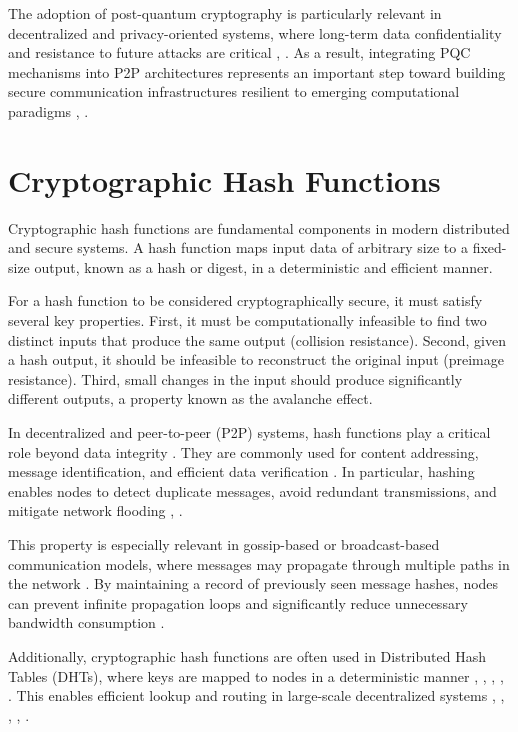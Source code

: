 \documentclass[
  12pt,
  oneside,
  a4paper,
  chapter=TITLE,
  section=TITLE,
  english,
  brazil
]{abntex2}
\begin{document}
The adoption of post-quantum cryptography is particularly relevant in decentralized and privacy-oriented systems, where long-term data confidentiality and resistance to future attacks are critical \cite{bos2017kyber}, \cite{nist2024fips203}. As a result, integrating PQC mechanisms into P2P architectures represents an important step toward building secure communication infrastructures resilient to emerging computational paradigms \cite{bos2017kyber}, \cite{nist2024fips203}.


\section{Cryptographic Hash Functions}

Cryptographic hash functions are fundamental components in modern distributed and secure systems. A hash function maps input data of arbitrary size to a fixed-size output, known as a hash or digest, in a deterministic and efficient manner.

For a hash function to be considered cryptographically secure, it must satisfy several key properties. First, it must be computationally infeasible to find two distinct inputs that produce the same output (collision resistance). Second, given a hash output, it should be infeasible to reconstruct the original input (preimage resistance). Third, small changes in the input should produce significantly different outputs, a property known as the avalanche effect.

In decentralized and peer-to-peer (P2P) systems, hash functions play a critical role beyond data integrity \cite{augustine2022byzantine}. They are commonly used for content addressing, message identification, and efficient data verification \cite{augustine2022byzantine}. In particular, hashing enables nodes to detect duplicate messages, avoid redundant transmissions, and mitigate network flooding \cite{mehr2019unstructured}, \cite{augustine2022byzantine}.

This property is especially relevant in gossip-based or broadcast-based communication models, where messages may propagate through multiple paths in the network \cite{augustine2022byzantine}. By maintaining a record of previously seen message hashes, nodes can prevent infinite propagation loops and significantly reduce unnecessary bandwidth consumption \cite{augustine2022byzantine}.

Additionally, cryptographic hash functions are often used in Distributed Hash Tables (DHTs), where keys are mapped to nodes in a deterministic manner \cite{stoica2001chord}, \cite{maymounkov2002kademlia}, \cite{rowstron2001pastry}, \cite{zhao2001tapestry}, \cite{augustine2022byzantine}. This enables efficient lookup and routing in large-scale decentralized systems \cite{stoica2001chord}, \cite{maymounkov2002kademlia}, \cite{rowstron2001pastry}, \cite{zhao2001tapestry}, \cite{augustine2022byzantine}.
\end{document}
